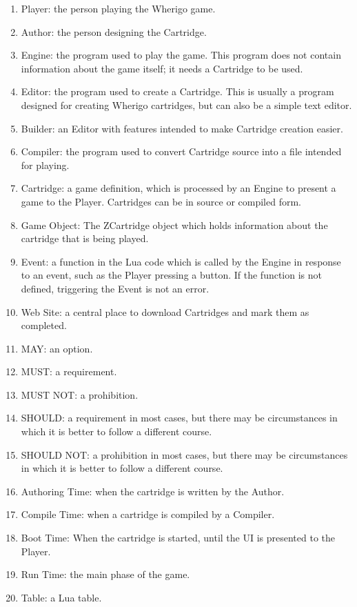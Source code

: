 \documentclass{article}
\begin{document}
\begin{enumerate}
	\item Player: the person playing the Wherigo game.
	\item Author: the person designing the Cartridge.
	\item Engine: the program used to play the game. This program does not contain information about the game itself; it needs a Cartridge to be used.
	\item Editor: the program used to create a Cartridge. This is usually a program designed for creating Wherigo cartridges, but can also be a simple text editor.
	\item Builder: an Editor with features intended to make Cartridge creation easier.
	\item Compiler: the program used to convert Cartridge source into  a file intended for playing.
	\item Cartridge: a game definition, which is processed by an Engine to present a game to the Player.  Cartridges can be in source or compiled form.
	\item Game Object: The ZCartridge object which holds information about the cartridge that is being played.
	\item Event: a function in the Lua code which is called by the Engine in response to an event, such as the Player pressing a button. If the function is not defined, triggering the Event is not an error.
	\item Web Site: a central place to download Cartridges and mark them as completed.
	\item MAY: an option.
	\item MUST: a requirement.
	\item MUST NOT: a prohibition.
	\item SHOULD: a requirement in most cases, but there may be circumstances in which it is better to follow a different course.
	\item SHOULD NOT: a prohibition in most cases, but there may be circumstances in which it is better to follow a different course.
	\item Authoring Time: when the cartridge is written by the Author.
	\item Compile Time: when a cartridge is compiled by a Compiler.
	\item Boot Time: When the cartridge is started, until the UI is presented to the Player.
	\item Run Time: the main phase of the game.
	\item Table: a Lua table.
\end{enumerate}
\end{document}
